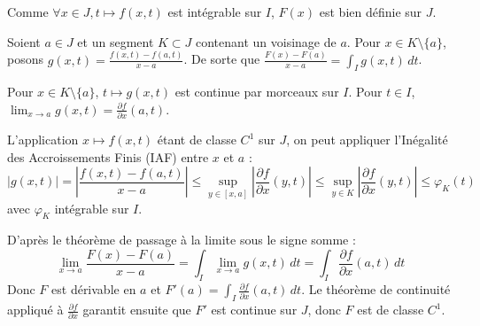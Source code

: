 \documentclass[a4paper, 12pt]{article}
\begin{document}
\begin{demonstration}
    Comme $\forall x \in J, t \mapsto f(x, t)$ est intégrable sur $I$, $F(x)$ est bien définie sur $J$.

    Soient $a \in J$ et un segment $K \subset J$ contenant un voisinage de $a$.
    Pour $x \in K \setminus \{a\}$, posons $g(x, t) = \frac{f(x, t) - f(a, t)}{x - a}$.
    De sorte que $\frac{F(x) - F(a)}{x - a} = \int_I g(x, t) \, dt$.

    Pour $x \in K \setminus \{a\}$, $t \mapsto g(x, t)$ est continue par morceaux sur $I$.
    Pour $t \in I$, $\lim_{x \to a} g(x, t) = \frac{\partial f}{\partial x}(a, t)$.
    
    L'application $x \mapsto f(x, t)$ étant de classe $C^1$ sur $J$, on peut appliquer l'Inégalité des Accroissements Finis (IAF) entre $x$ et $a$ :
    $$
    |g(x, t)| = \left| \frac{f(x, t) - f(a, t)}{x - a} \right| \leq \sup_{y \in [x, a]} \left| \frac{\partial f}{\partial x}(y, t) \right| \leq \sup_{y \in K} \left| \frac{\partial f}{\partial x}(y, t) \right| \leq \varphi_K(t)
    $$
    avec $\varphi_K$ intégrable sur $I$.
    
    D'après le théorème de passage à la limite sous le signe somme :
    $$
    \lim_{x \to a} \frac{F(x) - F(a)}{x - a} = \int_I \lim_{x \to a} g(x, t) \, dt = \int_I \frac{\partial f}{\partial x}(a, t) \, dt
    $$
    Donc $F$ est dérivable en $a$ et $F'(a) = \int_I \frac{\partial f}{\partial x}(a, t) \, dt$.
    Le théorème de continuité appliqué à $\frac{\partial f}{\partial x}$ garantit ensuite que $F'$ est continue sur $J$, donc $F$ est de classe $C^1$.
\end{demonstration}
\end{document}
